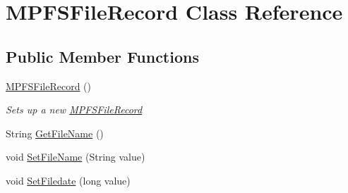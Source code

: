 \hypertarget{class_microchip_m_p_f_s_1_1_m_p_f_s_file_record}{}\section{M\+P\+F\+S\+File\+Record Class Reference}
\label{class_microchip_m_p_f_s_1_1_m_p_f_s_file_record}
\subsection*{Public Member Functions}
\begin{DoxyCompactItemize}
\item 
\hyperlink{class_microchip_m_p_f_s_1_1_m_p_f_s_file_record_adccb978b4976bf9d48cc73503a54ad96}{M\+P\+F\+S\+File\+Record} ()
\begin{DoxyCompactList}\small\item\em Sets up a new \hyperlink{class_microchip_m_p_f_s_1_1_m_p_f_s_file_record}{M\+P\+F\+S\+File\+Record} \end{DoxyCompactList}\item 
String \hyperlink{class_microchip_m_p_f_s_1_1_m_p_f_s_file_record_af51b9cf8302f21521c138d991c0f8f20}{Get\+File\+Name} ()
\item 
void \hyperlink{class_microchip_m_p_f_s_1_1_m_p_f_s_file_record_a1247aa2e77efaca500bf3f10635dec9e}{Set\+File\+Name} (String value)
\item 
void \hyperlink{class_microchip_m_p_f_s_1_1_m_p_f_s_file_record_ac71ab80f8b427eaeb53039a16870dbc5}{Set\+Filedate} (long value)
\end{DoxyCompactItemize}

